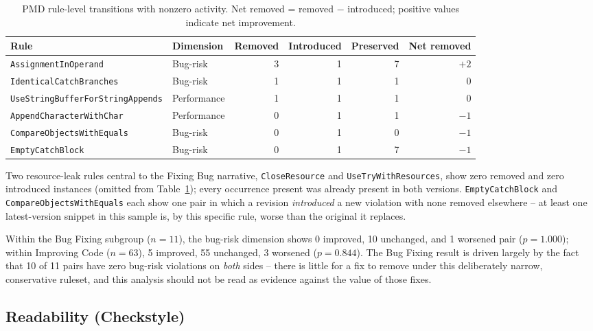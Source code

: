 \begin{table}[htbp]
\centering
\caption{PMD rule-level transitions with nonzero activity. Net removed
= removed $-$ introduced; positive values indicate net improvement.}
\label{tab:ba-pmd-rules}
\small
\begin{tabular}{llrrrr}
\toprule
Rule & Dimension & Removed & Introduced & Preserved & Net removed \\
\midrule
\texttt{AssignmentInOperand}             & Bug-risk    & 3 & 1 & 7 & $+2$ \\
\texttt{IdenticalCatchBranches}          & Bug-risk    & 1 & 1 & 1 & $0$ \\
\texttt{UseStringBufferForStringAppends} & Performance & 1 & 1 & 1 & $0$ \\
\texttt{AppendCharacterWithChar}         & Performance & 0 & 1 & 1 & $-1$ \\
\texttt{CompareObjectsWithEquals}        & Bug-risk    & 0 & 1 & 0 & $-1$ \\
\texttt{EmptyCatchBlock}                 & Bug-risk    & 0 & 1 & 7 & $-1$ \\
\bottomrule
\end{tabular}
\end{table}

Two resource-leak rules central to the Fixing Bug narrative,
\texttt{CloseResource} and \texttt{UseTryWithResources}, show zero
removed and zero introduced instances (omitted from
Table~\ref{tab:ba-pmd-rules}); every occurrence present was already
present in both versions. \texttt{EmptyCatchBlock} and
\texttt{CompareObjectsWithEquals} each show one pair in which a
revision \emph{introduced} a new violation with none removed elsewhere
-- at least one latest-version snippet in this sample is, by this
specific rule, worse than the original it replaces.

Within the Bug Fixing subgroup ($n=11$), the bug-risk dimension shows 0
improved, 10 unchanged, and 1 worsened pair ($p=1.000$); within Improving
Code ($n=63$), 5 improved, 55 unchanged, 3 worsened ($p=0.844$). The
Bug Fixing result is driven largely by the fact that 10 of 11 pairs have
zero bug-risk violations on \emph{both} sides -- there is little for a
fix to remove under this deliberately narrow, conservative ruleset, and
this analysis should not be read as evidence against the value of those
fixes.

\subsection{Readability (Checkstyle)}
\label{sec:before-after-checkstyle}

